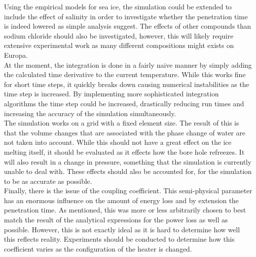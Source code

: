 \noindent
Using the empirical models for sea ice, the simulation could be extended to include the effect of salinity in order to investigate whether the penetration time is indeed lowered as simple analysis suggest. The effects of other compounds than sodium chloride should also be investigated, however, this will likely require extensive experimental work as many different compositions might exists on Europa.\\

\noindent
At the moment, the integration is done in a fairly naive manner by simply adding the calculated time derivative to the current temperature. While this works fine for short time steps, it quickly breaks down causing numerical instabilities as the time step is increased. By implementing more sophisticated integration algorithms the time step could be increased, drastically reducing run times and increasing the accuracy of the simulation simultaneously.\\

\noindent
The simulation works on a grid with a fixed element size. The result of this is that the volume changes that are associated with the phase change of water are not taken into account. While this should not have a great effect on the ice melting itself, it should be evaluated as it effects how the bore hole refreezes. It will also result in a change in pressure, something that the simulation is currently unable to deal with. These effects should also be accounted for, for the simulation to be as accurate as possible.\\

\noindent
Finally, there is the issue of the coupling coefficient. This semi-physical parameter has an enormous influence on the amount of energy loss and by extension the penetration time. As mentioned, this was more or less arbitrarily chosen to best match the result of the analytical expressions for the power loss as well as possible. However, this is not exactly ideal as it is hard to determine how well this reflects reality. Experiments should be conducted to determine how this coefficient varies as the configuration of the heater is changed.     


